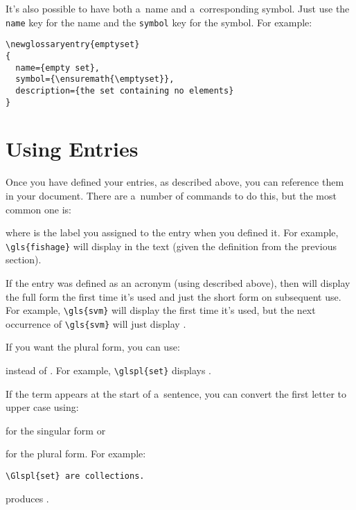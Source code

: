 \documentclass{nlctdoc}
\begin{document}
It's also possible to have both a~name and a~corresponding symbol.
Just use the \texttt{name} key for the name and the \texttt{symbol} key
for the symbol. For example:
\begin{verbatim}
\newglossaryentry{emptyset}
{
  name={empty set},
  symbol={\ensuremath{\emptyset}},
  description={the set containing no elements}
}
\end{verbatim}

\section{Using Entries}
\label{sec:useterm}

Once you have defined your entries, as described above, you can
reference them in your document. There are a~number of commands to
do this, but the most common one is:
\begin{definition}
\end{definition}
where  is the label you assigned to the entry when you
defined it. For example, \verb|\gls{fishage}| will display  in the text (given the definition from the previous section).

If the entry was defined as an acronym (using 
described above), then  will display the full form the first
time it's used and just the short form on
subsequent use. For example, \verb|\gls{svm}| will display  the first time it's used, but the next occurrence of
\verb|\gls{svm}| will just display .

If you want the plural form, you can use:
\begin{definition}
\end{definition}
instead of . For example, \verb|\glspl{set}|
displays .

If the term appears at the start of a~sentence, you can convert the
first letter to upper case using:
\begin{definition}
\end{definition}
for the singular form or
\begin{definition}
\end{definition}
for the plural form. For example:
\begin{verbatim}
\Glspl{set} are collections.
\end{verbatim}
produces .
\end{document}
